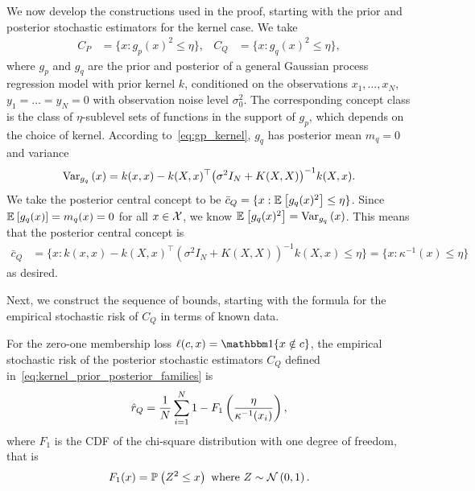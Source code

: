 \documentclass[onefignum,onetabnum]{siamart171218}
\begin{document}
We now develop the constructions used in the proof, starting with the
prior and posterior stochastic estimators for the kernel case.
We take
\begin{equation}
    \label{eq:kernel_prior_posterior_families}
    \begin{aligned}
        C_{P}
        &= \{x : g_p(x)^2 \le \eta\},
        & C_{Q} 
        &= \{x : g_q(x)^2 \le \eta\},
    \end{aligned}
\end{equation}
where $g_p$ and $g_q$ are the prior and posterior of a general Gaussian process
regression model with prior kernel $k$, conditioned on the observations
$x_1,\dotsc,x_N$, $y_1=\dotso=y_N=0$ with observation noise level $\sigma_0^2$.
The corresponding concept class is the class of $\eta$-sublevel sets of
functions in the support of $g_p$, which depends on the choice of kernel.
According to~\eqref{eq:gp_kernel}, $g_q$ has
posterior mean $m_q=0$ and variance
\begin{equation}
        \Var[g_q]{x}= k(x,x) - k(X,x)^\top{\left(\sigma^2 I_N + K(X,X)\right)}^{-1} k(X,x).
\end{equation}
We take the posterior central concept to be
$\bar{c}_Q=\{x : \Ex{g_q(x)^2} \le\eta\}$. 
Since $\Ex{g_q(x)}=m_q(x)=0$ for all $x\in\dom$, we know
$\Ex{g_q(x)^2}=\Var[g_q]{x}$. This means that the posterior central concept is
\begin{equation}
    \begin{aligned}
        \label{eq:kernel_central_concept}
        \bar{c}_{Q} &= \{x :
            k(x,x) - k(X,x)^\top{\left(\sigma^2 I_N + K(X,X)\right)}^{-1} k(X,x) 
            \le \eta
        \}
        = \{x : \kappa^{-1}(x) \le \eta\}
    \end{aligned}
\end{equation}
as desired.

Next, we construct the sequence of bounds, starting with the formula for the empirical
stochastic risk of $C_Q$ in terms of known data. 
\begin{lemma}
    \label{lem:empirical_stochastic_risk}
    For the zero-one membership loss $\ell(c,x)=\ind{x\notin c}$, the empirical
    stochastic risk of the posterior stochastic
    estimators $C_Q$ defined in~\eqref{eq:kernel_prior_posterior_families} is
    \begin{equation}
    \label{eq:poly_empirical_stochastic_risk}
        \esrisk
        =
        \avgion 1-F_1\left(\frac{\eta}{\kappa^{-1}(x_i)}\right),
    \end{equation}
    where $F_1$ is the CDF of the chi-square distribution with one degree of
    freedom, that is 
    \begin{equation}
        \label{eq:f1_def}
        F_1(x)=\Pr{Z^2 \le x} \text{ where } Z\sim\Norm{0,1}.
    \end{equation}
\end{lemma}
\end{document}
